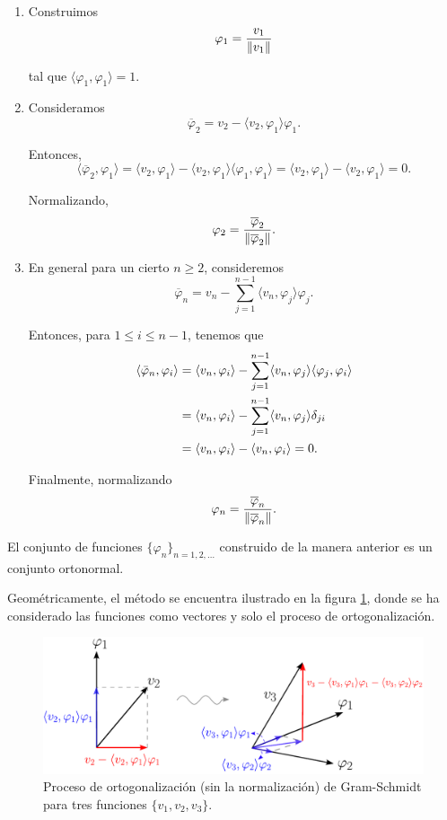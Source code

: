 \begin{enumerate}
    \item Construimos 
    $$\varphi_1 = \frac{v_1}{\lVert v_1\rVert}$$ 
    
    tal que $\langle \varphi_1 , \varphi_1 \rangle = 1$. 
    
    \item Consideramos
    $$\overline{\varphi}_2 = v_2 - \langle v_2, \varphi_1   \rangle \varphi_1.$$
    
    Entonces, 
    $$\langle \overline{\varphi}_2, \varphi_1 \rangle = \langle v_2, \varphi_1 \rangle - \langle  v_2, \varphi_1  \rangle \langle \varphi_1, \varphi_1 \rangle = \langle v_2, \varphi_1 \rangle -  \langle  v_2, \varphi_1 \rangle  = 0.$$
    
    Normalizando, 
    $$\varphi_2 = \frac{\overline{\varphi}_2}{\lVert\overline{\varphi}_2\rVert}.$$
    
    \item En general para un cierto $n \geq 2$, consideremos 
 $$\overline{\varphi}_n = v_n - \sum_{j=1}^{n-1} \langle  v_n, \varphi_j \rangle \varphi_j.$$
    
Entonces, para $1 \leq  i \leq n-1$, tenemos que
\begin{align*}
    \langle \Bar{\varphi}_n , \varphi_i \rangle &= \langle v_n , \varphi_i \rangle - \sum_{j=1}^{n-1} \langle v_n , \varphi_j \rangle \langle \varphi_j , \varphi_i\rangle \\
    &= \langle v_n, \varphi_i \rangle - \sum_{j=1}^{n-1} \langle v_n , \varphi_j \rangle \delta_{ji} \\
    &= \langle v_n , \varphi_i \rangle -  \langle v_n, \varphi_i \rangle = 0.
\end{align*}
    
Finalmente, normalizando    
$$\varphi_n = \frac{\overline{\varphi}_n}{\lVert\overline{\varphi}_n\rVert}.$$
\end{enumerate}

El conjunto de funciones $\{\varphi_n\}_{n = 1,2, \dots}$ construido de la manera anterior es un conjunto ortonormal.

Geométricamente, el método se encuentra ilustrado en la figura \ref{fig:Gram-Schmidt}, donde se ha considerado las funciones como vectores y solo el proceso de ortogonalización.

\begin{figure}[H]
    \centering
    \includegraphics[scale = 0.7]{Figuras/Gram-Schmidt.pdf}
    \caption{Proceso de ortogonalización (sin la normalización) de Gram-Schmidt para tres funciones $\{v_1,v_2,v_3\}$.}
    \label{fig:Gram-Schmidt}
\end{figure}

